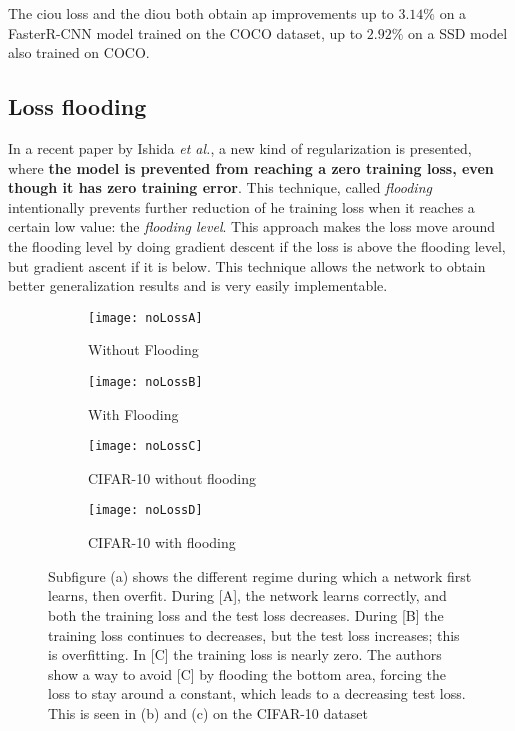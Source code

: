 The \gls{ciou} loss and the \gls{diou} both obtain \gls{ap} improvements up to $3.14 \%$ on a FasterR-CNN\cite{FasterRCNN} model trained on the COCO\cite{msCOCO} dataset, up to $2.92 \%$ on a SSD\cite{ssd} model also trained on COCO.

\subsection{Loss flooding}
In a recent paper by Ishida \textit{et al.}\cite{ishida2020}, a new kind of regularization is presented, where \textbf{the model is prevented from reaching a zero training loss, even though it has zero training error}. This technique, called \textit{flooding} intentionally prevents further reduction of he training loss when it reaches a certain low value: the \textit{flooding level}. This approach makes the loss move around the flooding level by doing gradient descent if the loss is above the flooding level, but gradient ascent if it is below. This technique allows the network to obtain better generalization results and is very easily implementable.

\begin{figure}[H]
	\begin{subfigure}[t]{.24\textwidth}
  \centering
  \texttt{[image: noLossA]}  
  \caption{Without Flooding}
  \label{fig:lossA}
\end{subfigure}
	\begin{subfigure}[t]{.24\textwidth}
  \centering
  \texttt{[image: noLossB]}  
  \caption{With Flooding}
  \label{fig:lossB}
\end{subfigure}
	\begin{subfigure}[t]{.24\textwidth}
  \centering
  \texttt{[image: noLossC]}  
  \caption{CIFAR-10 without flooding}
  \label{fig:lossC}
\end{subfigure}
	\begin{subfigure}[t]{.24\textwidth}
  \centering
  \texttt{[image: noLossD]}  
  \caption{CIFAR-10 with flooding}
  \label{fig:lossD}
\end{subfigure}
	\caption[Loss flooding]{Subfigure (a) shows the different regime during which a network first learns, then overfit. During [A], the network learns correctly, and both the training loss and the test loss decreases. During [B] the training loss continues to decreases, but the test loss increases; this is overfitting. In [C] the training loss is nearly zero. The authors show a way to avoid [C] by flooding the bottom area, forcing the loss to stay around a constant, which leads to a decreasing test loss. This is seen in (b) and (c) on the CIFAR-10 dataset}
\label{fig:flooding}
\end{figure}

